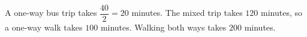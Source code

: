 A one-way bus trip takes $\dfrac{40}{2} = 20$ minutes. The mixed trip takes $120$ minutes, so a one-way walk takes $100$ minutes. Walking both ways takes $\boxed{200}$ minutes.
